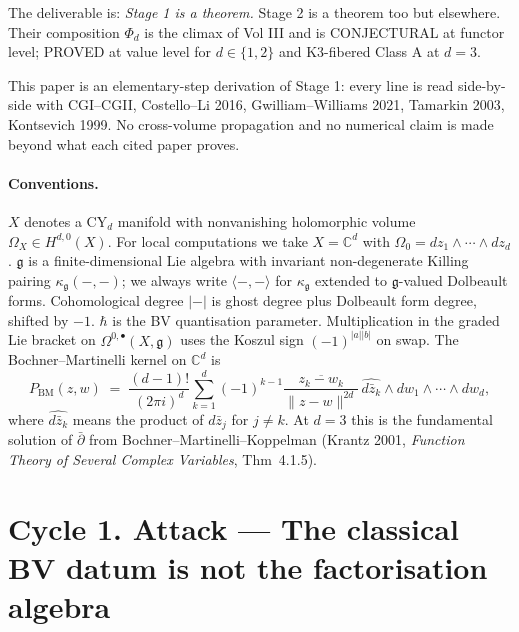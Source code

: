 \documentclass[11pt]{article}
\theoremstyle{definition}
\providecommand{\CC}{\mathbb{C}}
\providecommand{\fg}{\mathfrak{g}}
\providecommand{\hbarb}{\hbar}
\providecommand{\BM}{\mathrm{BM}}
\begin{document}
The deliverable is: \emph{Stage 1 is a theorem.} Stage 2 is a theorem
too but elsewhere. Their composition $\Phi_d$ is the climax of Vol III
and is CONJECTURAL at functor level; PROVED at value level for
$d\in\{1,2\}$ and K3-fibered Class A at $d=3$.

This paper is an elementary-step derivation of Stage 1: every line is
read side-by-side with CGI--CGII, Costello--Li 2016, Gwilliam--Williams
2021, Tamarkin 2003, Kontsevich 1999. No cross-volume propagation and
no numerical claim is made beyond what each cited paper proves.

\paragraph{Conventions.} $X$ denotes a CY$_d$ manifold with
nonvanishing holomorphic volume $\Omega_X \in H^{d,0}(X)$. For
local computations we take $X = \CC^d$ with $\Omega_0 = dz_1\wedge\cdots
\wedge dz_d$. $\fg$ is a finite-dimensional Lie algebra with
invariant non-degenerate Killing pairing $\kappa_\fg(-,-)$; we always
write $\langle -, - \rangle$ for $\kappa_\fg$ extended to $\fg$-valued
Dolbeault forms. Cohomological degree $|{-}|$ is ghost degree plus
Dolbeault form degree, shifted by $-1$. $\hbarb$ is the BV quantisation
parameter. Multiplication in the graded Lie bracket on $\Omega^{0,\bullet}(X,\fg)$
uses the Koszul sign $(-1)^{|a||b|}$ on swap. The Bochner--Martinelli
kernel on $\CC^d$ is
\[
  P_{\BM}(z,w)
  \;=\; \frac{(d-1)!}{(2\pi i)^d}
        \sum_{k=1}^{d} (-1)^{k-1}
        \frac{\overline{z_k - w_k}}{\|z-w\|^{2d}}
        \,\widehat{d\bar z_k} \wedge dw_1\wedge\cdots\wedge dw_d,
\]
where $\widehat{d\bar z_k}$ means the product of $d\bar z_j$ for
$j\neq k$. At $d=3$ this is the fundamental solution of $\bar\partial$
from Bochner--Martinelli--Koppelman (Krantz 2001, \emph{Function Theory
of Several Complex Variables}, Thm~4.1.5).

\section*{Cycle 1. Attack --- The classical BV datum is not the factorisation algebra}
\end{document}
